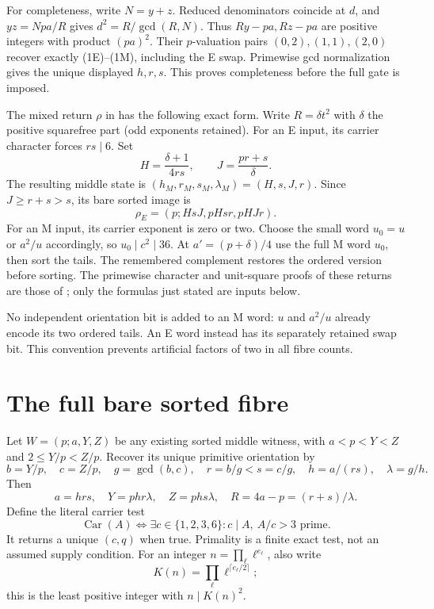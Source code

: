 For completeness, write $N=y+z$. Reduced denominators coincide at $d$,
and $yz=Npa/R$ gives $d^2=R/\gcd(R,N)$. Thus
$Ry-pa,Rz-pa$ are positive integers with product $(pa)^2$.
Their $p$-valuation pairs $(0,2),(1,1),(2,0)$ recover exactly (1E)--(1M),
including the E swap. Primewise gcd normalization gives the unique displayed
$h,r,s$. This proves completeness before the full gate is imposed.

The mixed return $\rho$ in \citet{Mixed} has the following exact form.
Write $R=\delta t^2$ with $\delta$ the positive squarefree part (odd
exponents retained). For an E input, its carrier character forces $rs\mid6$.
Set
\[
 H=\frac{\delta+1}{4rs},\qquad J=\frac{pr+s}{\delta}.
\]
The resulting middle state is $(h_M,r_M,s_M,\lambda_M)=(H,s,J,r)$.
Since $J\ge r+s>s$, its bare sorted image is
\begin{equation}\label{eq:forwardE}
 \rho_E=(p;HsJ,pHsr,pHJr).
\end{equation}
For an M input, its carrier exponent is zero or two. Choose the small word
$u_0=u$ or $a^2/u$ accordingly, so $u_0\mid c^2\mid36$.
At $a'=(p+\delta)/4$ use the full M word $u_0$, then sort the tails.
The remembered complement restores the ordered version before sorting.
The primewise character and unit-square proofs of these returns are those
of \citet[\S\S2--5]{Mixed}; only the formulas just stated are inputs below.

No independent orientation bit is added to an M word: $u$ and $a^2/u$
already encode its two ordered tails. An E word instead has its separately
retained swap bit. This convention prevents artificial factors of two in
all fibre counts.

\section{The full bare sorted fibre}
Let $W=(p;a,Y,Z)$ be any existing sorted middle witness, with
$a<p<Y<Z$ and $2\le Y/p<Z/p$.
Recover its unique primitive orientation by
\[
 b=Y/p,\quad c=Z/p,\quad g=\gcd(b,c),\quad
 r=b/g<s=c/g,\quad h=a/(rs),\quad\lambda=g/h.
\]
Then
\begin{equation}\label{eq:target}
 a=hrs,\quad Y=phr\lambda,\quad Z=phs\lambda,
 \quad R=4a-p=(r+s)/\lambda.
\end{equation}
Define the literal carrier test
\[
 \operatorname{Car}(A)\iff
 \exists c\in\{1,2,3,6\}:c\mid A,\ A/c>3\text{ prime}.
\]
It returns a unique $(c,q)$ when true. Primality is a finite exact test,
not an assumed supply condition.
For an integer $n=\prod_\ell\ell^{e_\ell}$, also write
\[
 K(n)=\prod_\ell\ell^{\lceil e_\ell/2\rceil};
\]
this is the least positive integer with $n\mid K(n)^2$.

